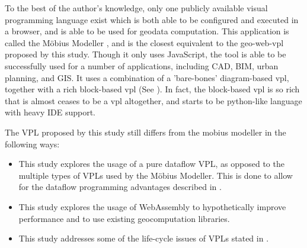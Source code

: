 To the best of the author's knowledge, only one publicly available visual programming language exist which is both able to be configured and executed in a browser, and is able to be used for geodata computation.
This application is called the Möbius Modeller \citep{janssen_mobius_2021}, and is the closest equivalent to the geo-web-vpl proposed by this study.
Though it only uses JavaScript, the tool is able to be successfully used for a number of applications, including CAD, BIM, urban planning, and GIS. 
It uses a combination of a 'bare-bones' diagram-based vpl, together with a rich block-based vpl (See ).
In fact, the block-based vpl is so rich that is almost ceases to be a vpl altogether, and starts to be python-like language with heavy IDE support.  

The VPL proposed by this study still differs from the mobius modeller in the following ways: 
\begin{itemize}[-]
  \item This study explores the usage of a pure dataflow VPL, as opposed to the multiple types of VPLs used by the Möbius Modeller. This is done to allow for the dataflow programming advantages described in .
  \item This study explores the usage of WebAssembly to hypothetically improve performance and to use existing geocomputation libraries.
  \item This study addresses some of the life-cycle issues of \ac{VPL}s stated in . 
\end{itemize}

